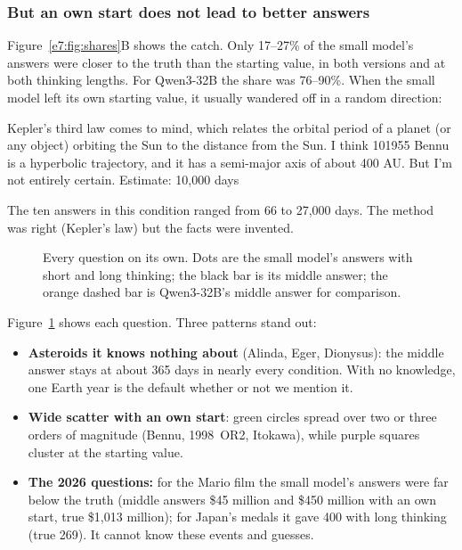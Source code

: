 \documentclass[11pt,a4paper]{article}
\begin{document}
\subsubsection{But an own start does not lead to better answers}

Figure~\ref{e7:fig:shares}B shows the catch. Only 17--27\% of the small model's answers were closer to the truth than the starting value, in both versions and at both thinking lengths. For Qwen3-32B the share was 76--90\%. When the small model left its own starting value, it usually wandered off in a random direction:

\begin{transcript}
\cut{} Kepler's third law comes to mind, which relates the orbital period of a planet (or any object) orbiting the Sun to the distance from the Sun. \cut{} I think 101955 Bennu is a hyperbolic trajectory, and it has a semi-major axis of about 400 AU. But I'm not entirely certain. \cut{}
 Estimate: 10,000 days
\end{transcript}

The ten answers in this condition ranged from 66 to 27,000 days. The method was right (Kepler's law) but the facts were invented.

\begin{figure}[ht]
\centering{}
\caption{Every question on its own. Dots are the small model's answers with short and long thinking; the black bar is its middle answer; the orange dashed bar is Qwen3-32B's middle answer for comparison.}
\label{e7:fig:items}
\end{figure}

Figure~\ref{e7:fig:items} shows each question. Three patterns stand out:
\begin{itemize}[leftmargin=*]
  \item \textbf{Asteroids it knows nothing about} (Alinda, Eger, Dionysus): the middle answer stays at about 365 days in nearly every condition. With no knowledge, one Earth year is the default whether or not we mention it.
  \item \textbf{Wide scatter with an own start}: green circles spread over two or three orders of magnitude (Bennu, 1998~OR2, Itokawa), while purple squares cluster at the starting value.
  \item \textbf{The 2026 questions:} for the Mario film the small model's answers were far below the truth (middle answers \$45 million and \$450 million with an own start, true \$1,013 million); for Japan's medals it gave 400 with long thinking (true 269). It cannot know these events and guesses.
\end{itemize}
\end{document}
